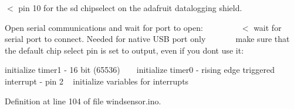 $<$ pin 10 for the sd chipselect on the adafruit datalogging shield.

Open serial communications and wait for port to open\+: ~\newline
~\newline
~\newline
~\newline
~\newline
 $<$ wait for serial port to connect. Needed for native U\+SB port only ~\newline
~\newline
~\newline
~\newline
 make sure that the default chip select pin is set to output, even if you don\textquotesingle{}t use it\+:

initialize timer1 -\/ 16 bit (65536) ~\newline
~\newline
 initialize timer0 -\/ rising edge triggered interrupt -\/ pin 2 ~\newline
 initialize variables for interrupts 

Definition at line 104 of file windsensor.\+ino.


